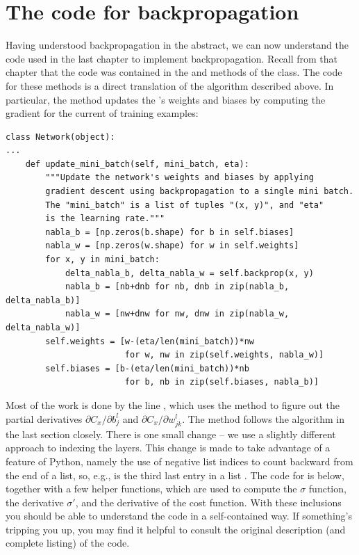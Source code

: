 \documentclass[a4paper,twoside,10pt]{book}
\begin{document}
\section{The code for backpropagation}
\label{sec:2.7}
Having understood backpropagation in the abstract, we can now understand the code used in the last chapter to implement backpropagation. Recall from that chapter that the code was contained in the  and  methods of the  class. The code for these methods is a direct translation of the algorithm described above. In particular, the   method updates the 's weights and biases by computing the gradient for the current  of training examples:
\begin{lstlisting}
class Network(object):
...
	def update_mini_batch(self, mini_batch, eta):
		"""Update the network's weights and biases by applying
		gradient descent using backpropagation to a single mini batch.
		The "mini_batch" is a list of tuples "(x, y)", and "eta"
		is the learning rate."""
		nabla_b = [np.zeros(b.shape) for b in self.biases]
		nabla_w = [np.zeros(w.shape) for w in self.weights]
		for x, y in mini_batch:
			delta_nabla_b, delta_nabla_w = self.backprop(x, y)
			nabla_b = [nb+dnb for nb, dnb in zip(nabla_b, delta_nabla_b)]
			nabla_w = [nw+dnw for nw, dnw in zip(nabla_w, delta_nabla_w)]
		self.weights = [w-(eta/len(mini_batch))*nw 
						for w, nw in zip(self.weights, nabla_w)]
		self.biases = [b-(eta/len(mini_batch))*nb 
						for b, nb in zip(self.biases, nabla_b)]

\end{lstlisting}
Most of the work is done by the line ,  which uses the  method to figure out the partial derivatives $\partial{}C_x/\partial{}b^l_j$ and $\partial{}C_x/\partial{}w^l_{jk}$. The  method follows the algorithm in the last section closely. There is one small change -- we use a slightly different approach to indexing the layers. This change is made to take advantage of a feature of Python, namely the use of negative list indices to count backward from the end of a list, so, e.g.,  is the third last entry in a list . The code for  is below, together with a few helper functions, which are used to compute the $\sigma$ function, the derivative $\sigma'$, and the derivative of the cost function. With these inclusions you should be able to understand the code in a self-contained way. If something's tripping you up, you may find it helpful to consult the original description (and complete listing) of the code.
\end{document}
